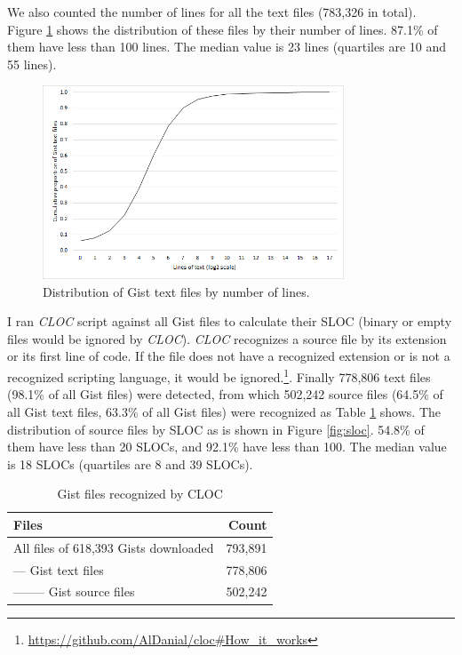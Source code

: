 We also counted the number of lines for all the text files (783,326 in total). Figure \ref{fig:textlines} shows the distribution of these files by their number of lines. 87.1\% of them have less than 100 lines. The median value is 23 lines (quartiles are 10 and 55 lines).

\begin{figure}[!htb]
	\centering
	\includegraphics[width=0.8\textwidth]{figures/text_files_lines.png}
	\caption{Distribution of Gist text files by number of lines.}
	\label{fig:textlines}
\end{figure}

I ran \textit{CLOC} script against all Gist files to calculate their SLOC (binary or empty files would be ignored by \textit{CLOC}). \textit{CLOC} recognizes a source file by its extension or its first line of code. If the file does not have a recognized extension or is not a recognized scripting language, it would be ignored.\footnote{\url{https://github.com/AlDanial/cloc\#How_it_works}}. Finally 778,806 text files (98.1\% of all Gist files) were detected, from which 502,242 source files (64.5\% of all Gist text files, 63.3\% of all Gist files) were recognized as Table \ref{tb:clocfiles} shows. The distribution of source files by SLOC as is shown in Figure \ref{fig:sloc}. 54.8\% of them have less than 20 SLOCs, and 92.1\% have less than 100. The median value is 18 SLOCs (quartiles are 8 and 39 SLOCs).

\begin{table}[!htb]
 \begin{center}
 \begin{tabular}{@{}lr} 
    \textbf{Files}	&	\textbf{Count} \\ \hline
	All files of 618,393 Gists downloaded &	793,891\\
	--- Gist text files	&	778,806\\
	-------- Gist source files &	502,242\\ \hline
 \end{tabular}
 \end{center}
 \caption{Gist files recognized by CLOC}
 \label{tb:clocfiles}
\end{table}

